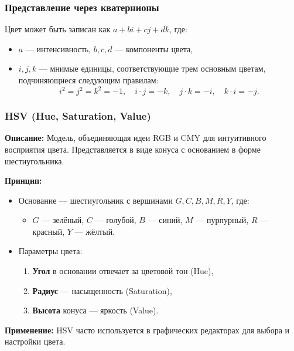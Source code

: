 \subsubsection{Представление через кватернионы}
Цвет может быть записан как $a + bi + cj + dk$, где:
\begin{itemize}
    \item $a$ — интенсивность, $b, c, d$ — компоненты цвета,
    \item $i, j, k$ — мнимые единицы, соответствующие трем основным цветам, подчиняющиеся следующим правилам:
          \[
              i^2 = j^2 = k^2 = -1, \quad i \cdot j = -k, \quad j \cdot k = -i, \quad k \cdot i = -j.
          \]
\end{itemize}

\subsubsection{HSV (Hue, Saturation, Value)}
\textbf{Описание:}
Модель, объединяющая идеи RGB и CMY для интуитивного восприятия цвета. Представляется в виде конуса с основанием в форме шестиугольника.

\textbf{Принцип:}
\begin{itemize}
    \item Основание — шестиугольник с вершинами $G, C, B, M, R, Y$, где:
          \begin{itemize}
              \item $G$ — зелёный, $C$ — голубой, $B$ — синий, $M$ — пурпурный, $R$ — красный, $Y$ — жёлтый.
          \end{itemize}
    \item Параметры цвета:
          \begin{enumerate}
              \item \textbf{Угол} в основании отвечает за цветовой тон (Hue),
              \item \textbf{Радиус} — насыщенность (Saturation),
              \item \textbf{Высота} конуса — яркость (Value).
          \end{enumerate}
\end{itemize}

\textbf{Применение:}
HSV часто используется в графических редакторах для выбора и настройки цвета.
